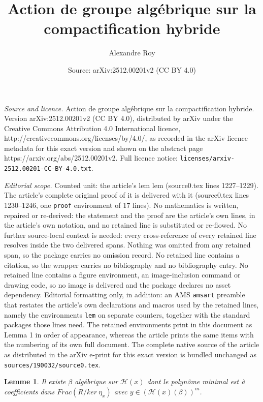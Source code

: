 \documentclass[10pt,a4paper]{amsart}
\title{Action de groupe algébrique sur la compactification hybride}
\author{Alexandre Roy}
\date{Source: arXiv:2512.00201v2 (CC BY 4.0)}
\newtheorem{lem}{Lemme}
\begin{document}
\maketitle

\noindent\emph{Source and licence.} Action de groupe algébrique sur la compactification hybride. Version arXiv:2512.00201v2 (CC BY 4.0), distributed by arXiv under the Creative Commons Attribution 4.0 International licence, http://creativecommons.org/licenses/by/4.0/, as recorded in the arXiv licence metadata for this exact version and shown on the abstract page https://arxiv.org/abs/2512.00201v2. Full licence notice: \texttt{licenses/arxiv-2512.00201-CC-BY-4.0.txt}.\par\smallskip

\noindent\textit{Editorial scope.} Counted unit: the article's lem lem (source0.tex lines 1227--1229). The article's complete original proof of it is delivered with it (source0.tex lines 1230--1246, one \texttt{proof} environment of 17 lines). No mathematics is written, repaired or re-derived: the statement and the proof are the article's own lines, in the article's own notation, and no retained line is substituted or re-flowed.  No further source-local context is needed: every cross-reference of every retained line resolves inside the two delivered spans.  Nothing was omitted from any retained span, so the package carries no omission record.  No retained line contains a citation, so the wrapper carries no bibliography and no bibliography entry.  No retained line contains a figure environment, an image-inclusion command or drawing code, so no image is delivered and the package declares no asset dependency.  Editorial formatting only, in addition: an AMS \texttt{amsart} preamble that restates the article's own declarations and macros used by the retained lines, namely the environments \texttt{lem} on separate counters, together with the standard packages those lines need.  The retained environments print in this document as Lemma 1 in order of appearance, whereas the article prints the same items with the numbering of its own full document.  The complete native source of the article as distributed in the arXiv e-print for this exact version is bundled unchanged as \texttt{sources/190032/source0.tex}.
\begin{lem}
Il existe $\beta$ algébrique sur $\mathcal{H}(x)$ dont le polynôme minimal est à coefficients dans $Frac(R/ker~\eta_x)$ avec $y \in (\mathcal{H}(x)(\beta))^m$.
\end{lem}
\end{document}
